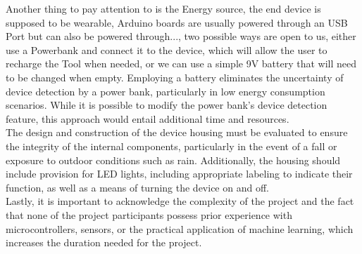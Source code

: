 Another thing to pay attention to is the Energy source, the end device is supposed to be wearable, Arduino boards are usually powered through an USB Port but can also be powered through..., 
two possible ways are open to us, either use a Powerbank and connect it to the device, which will allow the user to recharge the Tool when needed, or we can use a simple 9V battery that will need to be changed when empty. 
Employing a battery eliminates the uncertainty of device detection by a power bank, particularly in low energy consumption scenarios. While it is possible to modify the power bank's device detection feature, this approach would entail additional time and resources.\\
The design and construction of the device housing must be evaluated to ensure the integrity of the internal components, particularly in the event of a fall or exposure to outdoor conditions such as rain. Additionally, the housing should include provision for LED lights, including appropriate labeling to indicate their function, as well as a means of turning the device on and off.\\

Lastly, it is important to acknowledge the complexity of the project and the fact that none of the project participants possess prior experience with microcontrollers, sensors, or the practical application of machine learning, which increases the duration needed for the project.





